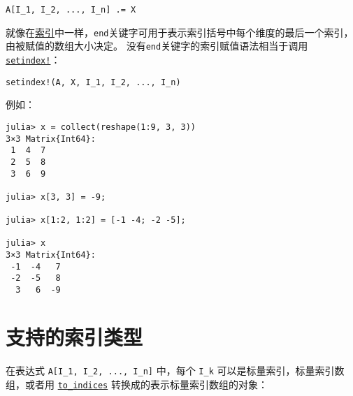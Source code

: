 \begin{lstlisting}
A[I_1, I_2, ..., I_n] .= X
\end{lstlisting}



就像在\hyperlink{16717190941363337071}{索引}中一样，\texttt{end}关键字可用于表示索引括号中每个维度的最后一个索引，由被赋值的数组大小决定。 没有\texttt{end}关键字的索引赋值语法相当于调用\hyperlink{1309244355901386657}{\texttt{setindex!}}：




\begin{lstlisting}
setindex!(A, X, I_1, I_2, ..., I_n)
\end{lstlisting}



例如：




\begin{verbatim}
julia> x = collect(reshape(1:9, 3, 3))
3×3 Matrix{Int64}:
 1  4  7
 2  5  8
 3  6  9

julia> x[3, 3] = -9;

julia> x[1:2, 1:2] = [-1 -4; -2 -5];

julia> x
3×3 Matrix{Int64}:
 -1  -4   7
 -2  -5   8
  3   6  -9
\end{verbatim}



\hypertarget{982887983034702059}{}


\section{支持的索引类型}



在表达式 \texttt{A[I\_1, I\_2, ..., I\_n]} 中，每个 \texttt{I\_k} 可以是标量索引，标量索引数组，或者用 \hyperlink{10027537986402266830}{\texttt{to\_indices}} 转换成的表示标量索引数组的对象：



